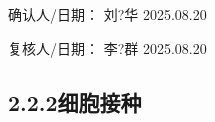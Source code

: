 \documentclass[UTF8,10pt,a4paper,fontset=fandol]{ctexart}
\newcommand{\fieldvalue}[1]{#1}
\newcommand{\handwritten}[1]{#1}
\begin{document}
确认人/日期：
\fieldvalue{\handwritten{刘?华}}
\quad
\fieldvalue{\handwritten{2025.08.20}}

\hfill
复核人/日期：
\fieldvalue{\handwritten{李?群}}
\quad
\fieldvalue{\handwritten{2025.08.20}}

\subsection{2.2.2\quad 细胞接种}
\end{document}
